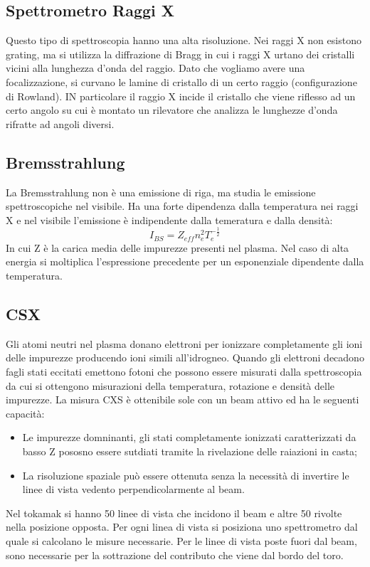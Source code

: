 \documentclass{article}
\begin{document}
\subsection{Spettrometro Raggi X}
Questo tipo di spettroscopia hanno una alta risoluzione. Nei raggi X non esistono grating, ma si utilizza la diffrazione di Bragg in cui i raggi X urtano dei cristalli vicini alla lunghezza d'onda del raggio. Dato che vogliamo avere una focalizzazione, si curvano le lamine di cristallo di un certo raggio (configurazione di Rowland). IN particolare il raggio X incide il cristallo che viene riflesso ad un certo angolo su cui è montato un rilevatore che analizza le lunghezze d'onda rifratte ad angoli diversi.
\subsection{Bremsstrahlung}
La Bremsstrahlung non è una emissione di riga, ma studia le emissione spettroscopiche nel visibile. Ha una forte dipendenza dalla temperatura nei raggi X e nel visibile l'emissione è indipendente dalla temeratura e dalla densità:
\begin{equation*}
    I_{BS}=Z_{eff}n_{e}^{2}T_{e}^{-\frac{1}{2}}
\end{equation*}
In cui Z è la carica media delle impurezze presenti nel plasma.
Nel caso di alta energia si moltiplica l'espressione precedente per un esponenziale dipendente dalla temperatura.\newline
\subsection{CSX}
Gli atomi neutri nel plasma donano elettroni per ionizzare completamente gli ioni delle impurezze producendo ioni simili all'idrogneo. Quando gli elettroni decadono fagli stati eccitati emettono fotoni che possono essere misurati dalla spettroscopia da cui si ottengono misurazioni della temperatura, rotazione e densità delle impurezze.
La misura CXS è ottenibile sole con un beam attivo ed ha le seguenti capacità:\begin{itemize}
    \item Le impurezze domninanti, gli stati completamente ionizzati caratterizzati da basso Z pososno essere sutdiati tramite la rivelazione delle raiazioni in casta;
    \item La risoluzione spaziale può essere ottenuta senza la necessità di invertire le linee di vista vedento perpendicolarmente al beam.
\end{itemize}
Nel tokamak si hanno 50 linee di vista che incidono il beam e altre 50 rivolte nella posizione opposta. Per ogni linea di vista si posiziona uno spettrometro dal quale si calcolano le misure necessarie. Per le linee di vista poste fuori dal beam, sono necessarie per la sottrazione del contributo che viene dal bordo del toro.
\end{document}
